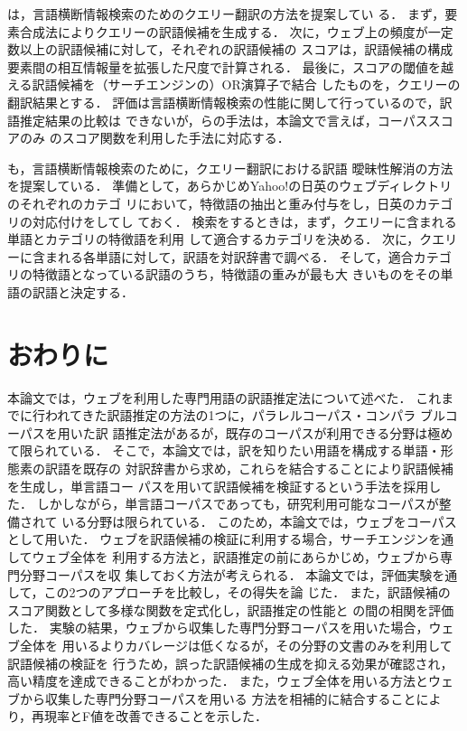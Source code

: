 \documentclass[japanese]{jnlp_1.3a}
\begin{document}
\cite{Maeda00}は，言語横断情報検索のためのクエリー翻訳の方法を提案してい
る．
まず，要素合成法によりクエリーの訳語候補を生成する．
次に，ウェブ上の頻度が一定数以上の訳語候補に対して，それぞれの訳語候補の
スコアは，訳語候補の構成要素間の相互情報量を拡張した尺度で計算される．
最後に，スコアの閾値を越える訳語候補を（サーチエンジンの）OR演算子で結合
したものを，クエリーの翻訳結果とする．
評価は言語横断情報検索の性能に関して行っているので，訳語推定結果の比較は
できないが，\cite{Maeda00}らの手法は，本論文で言えば，コーパススコアのみ
のスコア関数を利用した手法に対応する．

\cite{Kimura04}も，言語横断情報検索のために，クエリー翻訳における訳語
曖昧性解消の方法を提案している．
準備として，あらかじめYahoo!の日英のウェブディレクトリのそれぞれのカテゴ
リにおいて，特徴語の抽出と重み付与をし，日英のカテゴリの対応付けをしてし
ておく．
検索をするときは，まず，クエリーに含まれる単語とカテゴリの特徴語を利用
して適合するカテゴリを決める．
次に，クエリーに含まれる各単語に対して，訳語を対訳辞書で調べる．
そして，適合カテゴリの特徴語となっている訳語のうち，特徴語の重みが最も大
きいものをその単語の訳語と決定する．

\section{おわりに}
\label{sec:end}


本論文では，ウェブを利用した専門用語の訳語推定法について述べた．
これまでに行われてきた訳語推定の方法の1つに，パラレルコーパス・コンパラ
ブルコーパスを用いた訳
語推定法があるが，既存のコーパスが利用できる分野は極めて限られている．
そこで，本論文では，訳を知りたい用語を構成する単語・形態素の訳語を既存の
対訳辞書から求め，これらを結合することにより訳語候補を生成し，単言語コー
パスを用いて訳語候補を検証するという手法を採用した．
しかしながら，単言語コーパスであっても，研究利用可能なコーパスが整備されて
いる分野は限られている．
このため，本論文では，ウェブをコーパスとして用いた．
ウェブを訳語候補の検証に利用する場合，サーチエンジンを通してウェブ全体を
利用する方法と，訳語推定の前にあらかじめ，ウェブから専門分野コーパスを収
集しておく方法が考えられる．
本論文では，評価実験を通して，この2つのアプローチを比較し，その得失を論
じた．
また，訳語候補のスコア関数として多様な関数を定式化し，訳語推定の性能と
の間の相関を評価した．
実験の結果，ウェブから収集した専門分野コーパスを用いた場合，ウェブ全体を
用いるよりカバレージは低くなるが，その分野の文書のみを利用して訳語候補の検証を
行うため，誤った訳語候補の生成を抑える効果が確認され，高い精度を達成できることがわかった．
また，ウェブ全体を用いる方法とウェブから収集した専門分野コーパスを用いる
方法を相補的に結合することにより，再現率とF値を改善できることを示した．
\end{document}
